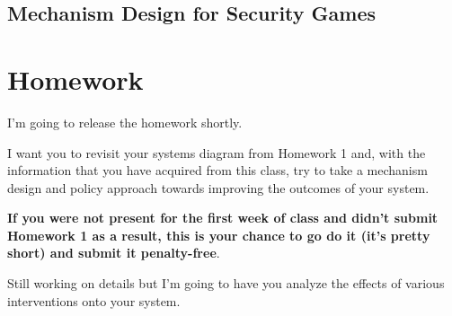 \documentclass[11pt]{article}
\begin{document}
\subsection{Mechanism Design for Security Games}

\section{Homework}

I'm going to release the homework shortly.

I want you to revisit your systems diagram from Homework 1 and, with the information that you have acquired from this class, try to take a mechanism design and policy approach towards improving the outcomes of your system. 

{\bf If you were not present for the first week of class and didn't submit Homework 1 as a result, this is your chance to go do it (it's pretty short) and submit it penalty-free}.

Still working on details but I'm going to have you analyze the effects of various interventions onto your system. 
\end{document}
